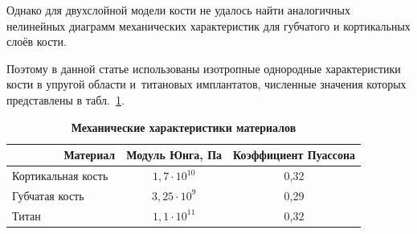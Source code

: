 Однако для двухслойной модели кости не удалось найти аналогичных нелинейных диаграмм механических характеристик для губчатого и кортикальных слоёв кости. 

Поэтому в данной статье использованы изотропные однородные характеристики кости в упругой области \cite{nekh:b4} и~титановых имплантатов, численные значения которых представлены в табл.~\ref{nekh:t1}.







\begin{table}[h]\small \centering



\begin{minipage}{.8\textwidth}

\centering



\caption{\bf Механические характеристики материалов} \label{nekh:t1}

\vspace{-3mm}

\centering

\begin{tabular}{l|c|c}

\hline

\footnotesize

~~~~~~~~Материал & 

\footnotesize

Модуль Юнга, Па & 

\footnotesize

Коэффициент Пуассона

\\ \hline

\rule{0mm}{12pt}%

Кортикальная кость & $1,7 \cdot 10^{10}$ & 0,32 \\ 

Губчатая кость & $3,25 \cdot 10^9$ & 0,29 \\ 

Титан & $1,1  \cdot 10^{11}$ & 0,32 \\ \hline

\end{tabular}



\end{minipage}



\end{table}







